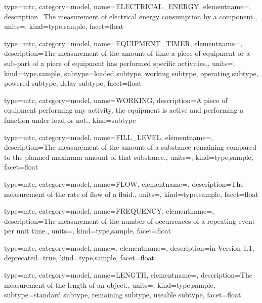 {
  type=mtc,
  category=model,
  name={ELECTRICAL\_ENERGY},
  elementname=,
  description={The measurement of electrical energy consumption by a component.},
  units=,
  kind={type,sample},
  facet={\gls{float}}
}


{
  type=mtc,
  category=model,
  name={EQUIPMENT\_TIMER},
  elementname=,
  description={The measurement of the amount of time a piece of equipment or a sub-part of a piece of equipment has performed specific activities.},
  units=,
  kind={type,sample},
  subtype={\gls{loaded subtype}, \gls{working subtype}, \gls{operating subtype}, \gls{powered subtype}, \gls{delay subtype}},
  facet={\gls{float}}
}



{
  type=mtc,
  category=model,
  name={WORKING},
  description={A piece of equipment performing any activity, the equipment is active and performing a function under load or not.},
  kind={subtype}
}


{
  type=mtc,
  category=model,
  name={FILL\_LEVEL},
  elementname=,
  description={The measurement of the amount of a substance remaining compared to the planned maximum amount of that substance.},
  units=,
  kind={type,sample},
  facet={\gls{float}}
}


{
  type=mtc,
  category=model,
  name={FLOW},
  elementname=,
  description={The measurement of the rate of flow of a fluid.},
  units=,
  kind={type,sample},
  facet={\gls{float}}
}


{
  type=mtc,
  category=model,
  name={FREQUENCY},
  elementname=,
  description={The measurement of the number of occurrences of a repeating event per unit time.},
  units=,
  kind={type,sample},
  facet={\gls{float}}
}


{
  type=mtc,
  category=model,
  name=,
  elementname=,
  description={\DEPRECATED in Version 1.1},
  deprecated={true},
  kind={type,sample},
  facet={\gls{float}}
}


{
  type=mtc,
  category=model,
  name={LENGTH},
  elementname=,
  description={The measurement of the length of an object.},
  units=,
  kind={type,sample},
  subtype={\gls{standard subtype}, \gls{remaining subtype}, \gls{useable subtype}},
  facet={\gls{float}}
}


